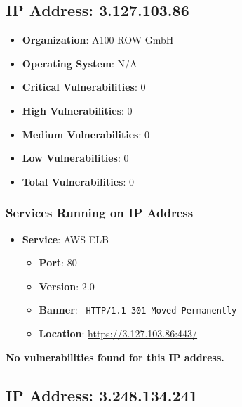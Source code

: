 \documentclass{article}
\begin{document}
\clearpage



\subsection*{IP Address: 3.127.103.86}

\begin{itemize}
    \item \textbf{Organization}: A100 ROW GmbH
    \item \textbf{Operating System}:  N/A 
    \item \textbf{Critical Vulnerabilities}: 0
    \item \textbf{High Vulnerabilities}: 0
    \item \textbf{Medium Vulnerabilities}: 0
    \item \textbf{Low Vulnerabilities}: 0
    \item \textbf{Total Vulnerabilities}: 0
\end{itemize}

\subsubsection*{Services Running on IP Address}

\begin{itemize}
    
        \item \textbf{Service}: AWS ELB
        \begin{itemize}
            \item \textbf{Port}: 80
            \item \textbf{Version}:  2.0 
            \item \textbf{Banner}: \texttt{
                HTTP/1.1 301 Moved Permanently
            }
            \item \textbf{Location}: \href{ https://3.127.103.86:443/ }{ https://3.127.103.86:443/ }
        \end{itemize}
    
\end{itemize}


\textbf{No vulnerabilities found for this IP address.}




\clearpage



\subsection*{IP Address: 3.248.134.241}
\end{document}
